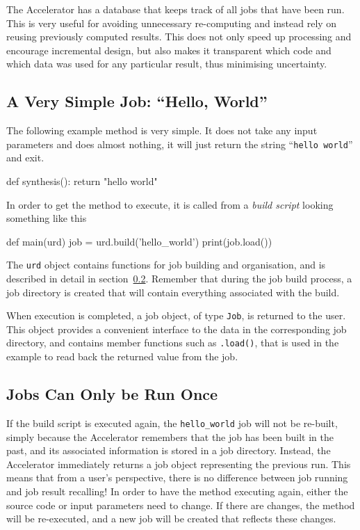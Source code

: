 The Accelerator has a database that keeps track of all jobs that have
been run.  This is very useful for avoiding unnecessary re-computing
and instead rely on reusing previously computed results.  This does
not only speed up processing and encourage incremental design, but
also makes it transparent which code and which data was used for any
particular result, thus minimising uncertainty.


\subsection{A Very Simple Job:  ``Hello, World''}
The following example method is very simple.  It does not take any
input parameters and does almost nothing, it will just return the
string ``\texttt{hello world}'' and exit.
\begin{python}
def synthesis():
    return "hello world"
\end{python}
In order to get the method to execute, it is called from a
\textsl{build script} looking something like this
\begin{python}
def main(urd)
    job = urd.build('hello_world')
    print(job.load())
\end{python}
The \texttt{urd} object contains functions for job building and
organisation, and is described in detail in section~\ref{}.  Remember
that during the job build process, a job directory is created that
will contain everything associated with the build.

When execution is completed, a job object, of type \texttt{Job}, is
returned to the user.  This object provides a convenient interface to
the data in the corresponding job directory, and contains member
functions such as \texttt{.load()}, that is used in the example to
read back the returned value from the job.


\subsection{Jobs Can Only be Run Once}
If the build script is executed again, the \texttt{hello\_world} job
will not be re-built, simply because the Accelerator remembers that
the job has been built in the past, and its associated information is
stored in a job directory.  Instead, the Accelerator immediately
returns a job object representing the previous run.  This means that
from a user's perspective, there is no difference between job running
and job result recalling!  In order to have the method executing
again, either the source code or input parameters need to change.  If
there are changes, the method will be re-executed, and a new job will
be created that reflects these changes.


